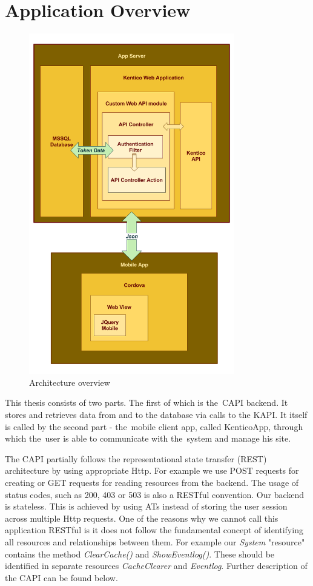 \section{Application Overview}
\begin{figure}[ht!]
  \centering
  \includegraphics[width=0.8\textwidth]{Images/Architecture.png}
  \caption{Architecture overview}
  \label{architectureOverview}
\end{figure}
This thesis consists of two parts. The first of which is the~CAPI backend. It stores and retrieves data from and to the database via calls to the KAPI. It itself is called by the second part - the~mobile client app, called KenticoApp, through which the~user is able to communicate with the~system and manage his site.

The CAPI partially follows the representational state transfer (REST) architecture by using appropriate Http. For example we use POST requests for creating or GET requests for reading resources from the backend. The usage of status codes, such as 200, 403 or 503 is also a RESTful convention. Our backend is stateless. This is achieved by using ATs instead of storing the user session across multiple Http requests. One of the reasons why we cannot call this application RESTful is it does not follow the fundamental concept of identifying all resources and relationships between them. For example our \textit{System} "resource" contains the method \textit{ClearCache()} and \textit{ShowEventlog()}. These should be identified in separate resources \textit{CacheClearer} and \textit{Eventlog}. Further description of the CAPI can be found below.

